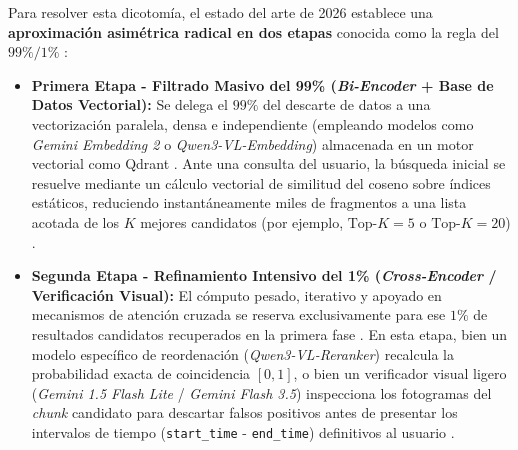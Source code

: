 Para resolver esta dicotomía, el estado del arte de 2026 establece una \textbf{aproximación asimétrica radical en dos etapas} conocida como la regla del $99\% / 1\%$ \cite{learnopencv_qwen3, qwen3_vl_emb2026}:
\begin{itemize}
    \item \textbf{Primera Etapa - Filtrado Masivo del 99\% (\textit{Bi-Encoder} + Base de Datos Vectorial):} Se delega el $99\%$ del descarte de datos a una vectorización paralela, densa e independiente (empleando modelos como \textit{Gemini Embedding 2} o \textit{Qwen3-VL-Embedding}) almacenada en un motor vectorial como Qdrant \cite{gemini_emb2_docs, qwen3_vl_emb2026}. Ante una consulta del usuario, la búsqueda inicial se resuelve mediante un cálculo vectorial de similitud del coseno sobre índices estáticos, reduciendo instantáneamente miles de fragmentos a una lista acotada de los $K$ mejores candidatos (por ejemplo, $\text{Top-}K = 5$ o $\text{Top-}K = 20$) \cite{learnopencv_qwen3}.
    \item \textbf{Segunda Etapa - Refinamiento Intensivo del 1\% (\textit{Cross-Encoder} / Verificación Visual):} El cómputo pesado, iterativo y apoyado en mecanismos de atención cruzada se reserva exclusivamente para ese $1\%$ de resultados candidatos recuperados en la primera fase \cite{learnopencv_qwen3}. En esta etapa, bien un modelo específico de reordenación (\textit{Qwen3-VL-Reranker}) recalcula la probabilidad exacta de coincidencia $[0, 1]$, o bien un verificador visual ligero (\textit{Gemini 1.5 Flash Lite} / \textit{Gemini Flash 3.5}) inspecciona los fotogramas del \textit{chunk} candidato para descartar falsos positivos antes de presentar los intervalos de tiempo (\texttt{start\_time} - \texttt{end\_time}) definitivos al usuario \cite{learnopencv_qwen3, qwen3_vl_emb2026}.
\end{itemize}

